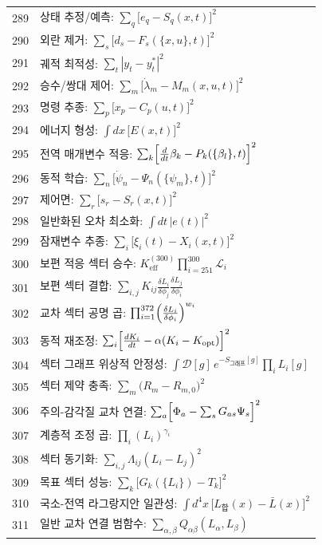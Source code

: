 \documentclass[11pt,a4paper]{article}
\begin{document}
\begin{longtable}{r l}
		289 & 상태 추정/예측: $\sum_q\bigl[e_q - S_q(x,t)\bigr]^2$ \\
		290 & 외란 제거: $\sum_s\bigl[d_s - F_s(\{x,u\},t)\bigr]^2$ \\
		291 & 궤적 최적성: $\sum_t|y_t - y_t^*|^2$ \\
		292 & 승수/쌍대 제어: $\sum_m\bigl[\dot\lambda_m - M_m(x,u,t)\bigr]^2$ \\
		293 & 명령 추종: $\sum_p\bigl[x_p - C_p(u,t)\bigr]^2$ \\
		294 & 에너지 형성: $\int dx\,\bigl[E(x,t)\bigr]^2$ \\
		295 & 전역 매개변수 적응: $\sum_k\Bigl[\frac{d}{dt}\beta_k - P_k(\{\beta_l\},t)\Bigr]^2$ \\
		296 & 동적 학습: $\sum_n\bigl[\dot\psi_n - \Psi_n(\{\psi_m\},t)\bigr]^2$ \\
		297 & 제어면: $\sum_r\bigl[s_r - S_r(x,t)\bigr]^2$ \\
		298 & 일반화된 오차 최소화: $\int dt\,|e(t)|^2$ \\
		299 & 잠재변수 추종: $\sum_i\bigl[\xi_i(t) - X_i(x,t)\bigr]^2$ \\
		300 & 보편 적응 섹터 승수: $K^{(300)}_{\mathrm{eff}}\prod_{i=251}^{300}\mathcal{L}_i$ \\
		301 & 보편 섹터 결합: $\sum_{i,j}K_{ij}\frac{\delta L_i}{\delta\phi_j}\frac{\delta L_j}{\delta\phi_i}$ \\
		302 & 교차 섹터 공명 곱: $\prod_{i=1}^{372}\Bigl(\frac{\delta L_i}{\delta\phi_i}\Bigr)^{w_i}$ \\
		303 & 동적 재조정: $\sum_i\Bigl[\frac{dK_i}{dt} - \alpha(K_i - K_{\text{opt}})\Bigr]^2$ \\
		304 & 섹터 그래프 위상적 안정성: $\int\mathcal{D}[g]\,e^{-S_{\text{그래프}}[g]}\prod_i L_i[g]$ \\
		305 & 섹터 제약 충족: $\sum_m\bigl(R_m - R_{m,0}\bigr)^2$ \\
		306 & 주의-감각질 교차 연결: $\sum_a\Bigl[\Phi_a - \sum_s G_{as}\Psi_s\Bigr]^2$ \\
		307 & 계층적 조정 곱: $\prod_i(L_i)^{\gamma_i}$ \\
		308 & 섹터 동기화: $\sum_{i,j}\Lambda_{ij}(L_i - L_j)^2$ \\
		309 & 목표 섹터 성능: $\sum_k\bigl[G_k(\{L_i\}) - T_k\bigr]^2$ \\
		310 & 국소-전역 라그랑지안 일관성: $\int d^4x\,\bigl[L_{\text{합}}(x) - \bar L(x)\bigr]^2$ \\
		311 & 일반 교차 연결 범함수: $\sum_{\alpha,\beta}Q_{\alpha\beta}(L_\alpha,L_\beta)$ \\

\end{longtable}
\end{document}
